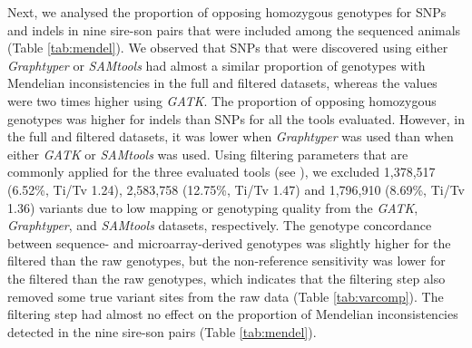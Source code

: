 \documentclass[../main.tex]{subfiles}
\begin{document}
Next, we analysed the proportion of opposing homozygous genotypes for SNPs and indels in nine sire-son pairs that were included among the sequenced animals (Table \ref{tab:mendel}). 
We observed that SNPs that were discovered using either \emph{Graphtyper} or \emph{SAMtools} had almost a similar proportion of genotypes with Mendelian inconsistencies in the full and filtered datasets, whereas the values were two times higher using \emph{GATK}. 
The proportion of opposing homozygous genotypes was higher for indels than SNPs for all the tools evaluated. 
However, in the full and filtered datasets, it was lower when \emph{Graphtyper} was used than when either \emph{GATK} or \emph{SAMtools} was used. Using filtering parameters that are commonly applied for the three evaluated tools (see ), 
we excluded 1,378,517 (6.52\%, Ti/Tv 1.24), 2,583,758 (12.75\%, Ti/Tv 1.47) and 1,796,910 (8.69\%, Ti/Tv 1.36) variants due to low mapping or genotyping quality from the \emph{GATK}, \emph{Graphtyper}, and \emph{SAMtools} datasets, respectively. 
The genotype concordance between sequence- and microarray-derived genotypes was slightly higher for the filtered than the raw genotypes, but the non-reference sensitivity was lower for the filtered than the raw genotypes, which indicates that the filtering step also removed some true variant sites from the raw data (Table \ref{tab:varcomp}). 
The filtering step had almost no effect on the proportion of Mendelian inconsistencies detected in the nine sire-son pairs (Table \ref{tab:mendel}).
\end{document}
